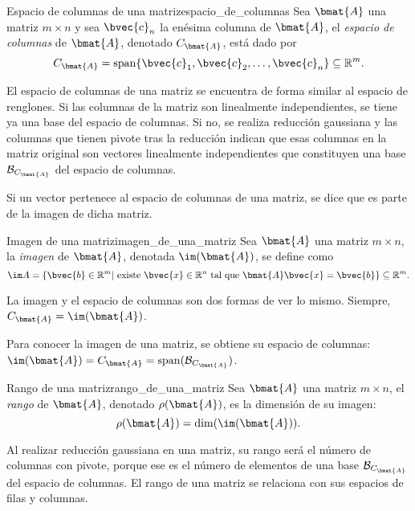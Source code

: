 \documentclass{fmbnotes}
\begin{document}
\begin{definicion}{Espacio de columnas de una matriz}{espacio_de_columnas}
	Sea \(\bmat{A}\) una matriz \(m \times n \) y sea \(\bvec{c}_n\) la enésima columna de \(\bmat{A}\), el \emph{espacio de columnas} de \(\bmat{A}\), denotado \(C_{\bmat{A}}\), está dado por
	\[C_{\bmat{A}}=\operatorname{span}\{\bvec{c}_1,\bvec{c}_2,\ldots,\bvec{c}_n\} \subseteq \mathbb{R}^{m}.\]
\end{definicion}

El espacio de columnas de una matriz se encuentra de forma similar al espacio de renglones. Si las columnas de la matriz son linealmente independientes, se tiene ya una base del espacio de columnas. Si no, se realiza reducción gaussiana y las columnas que tienen pivote tras la reducción indican que esas columnas en la matriz original son vectores linealmente independientes que constituyen una base \(\mathcal{B}_{C_{\bmat{A}}}\) del espacio de columnas. 

Si un vector pertenece al espacio de columnas de una matriz, se dice que es parte de la imagen de dicha matriz. 

\begin{definicion}{Imagen de una matriz}{imagen_de_una_matriz}
	Sea \(\bmat{A}\) una matriz \(m \times n \), la \emph{imagen} de \(\bmat{A}\), denotada \(\im(\bmat{A})\), se define como
	\[\im A=\{\bvec{b}\in\mathbb{R}^{m}|\text{ existe } \bvec{x} \in \mathbb{R}^{n} \text{ tal que }\bmat{A}\bvec{x}=\bvec{b}\} \subseteq \mathbb{R}^{m}.\]
\end{definicion}

\begin{tip}
	La imagen y el espacio de columnas son dos formas de ver lo mismo. Siempre, \(C_{\bmat{A}}=\im(\bmat{A})\).
\end{tip}

Para conocer la imagen de una matriz, se obtiene su espacio de columnas: \(\im(\bmat{A})=C_{\bmat{A}}=\operatorname{span}(\mathcal{B}_{C_{\bmat{A}}})\). 

\begin{definicion}{Rango de una matriz}{rango_de_una_matriz}
	Sea \(\bmat{A}\) una matriz \(m \times n \), el \emph{rango} de \(\bmat{A}\), denotado \(\rho(\bmat{A})\), es la dimensión de su imagen:
	\[\rho(\bmat{A})=\dim(\im(\bmat{A})).\]
\end{definicion}


Al realizar reducción gaussiana en una matriz, su rango será el número de columnas con pivote, porque ese es el número de elementos de una base \(\mathcal{B}_{C_{\bmat{A}}}\) del espacio de columnas. El rango de una matriz se relaciona con sus espacios de filas y columnas.
\end{document}
